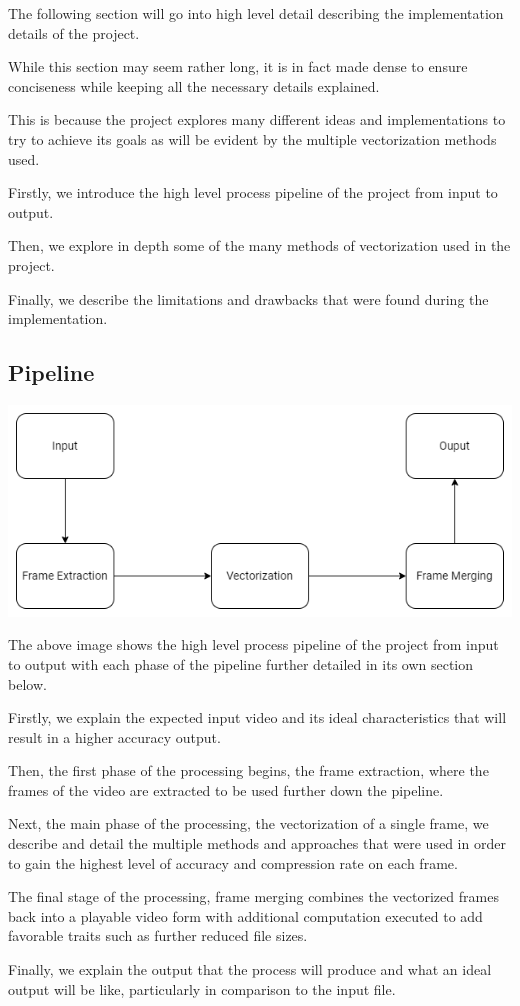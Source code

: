 \documentclass[12pt]{article}
\newcommand{\sentence}{} %
\begin{document}
    \tab
    The following section will go into high level detail describing the implementation details of the project.
    \sentence
    While this section may seem rather long, it is in fact made dense to ensure conciseness while keeping all the
    necessary details explained.
    \sentence
    This is because the project explores many different ideas and implementations to try to achieve its goals as will
    be evident by the multiple vectorization methods used.
    \sentence
    Firstly, we introduce the high level process pipeline of the project from input to output.
    \sentence
    Then, we explore in depth some of the many methods of vectorization used in the project.
    \sentence
    Finally, we describe the limitations and drawbacks that were found during the implementation.

    \subsection{Pipeline}\label{subsec:pipeline}

    \bigskip


    \includegraphics[width=\textwidth]{Pipeline.png}


    \bigskip

    The above image shows the high level process pipeline of the project from input to output with each phase of the
    pipeline further detailed in its own section below.
    \sentence
    Firstly, we explain the expected input video and its ideal characteristics that will result in a higher accuracy output.
    \sentence
    Then, the first phase of the processing begins, the frame extraction, where the frames of the video are
    extracted to be used further down the pipeline.
    \sentence
    Next, the main phase of the processing, the vectorization of a single frame, we describe and detail the multiple methods
    and approaches that were used in order to gain the highest level of accuracy and compression rate on each frame.
    \sentence
    The final stage of the processing, frame merging combines the vectorized frames back into a playable video form
    with additional computation executed to add favorable traits such as further reduced file sizes.
    \sentence
    Finally, we explain the output that the process will produce and what an ideal output will be like, particularly in
    comparison to the input file.
\end{document}
